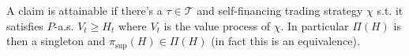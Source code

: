 A claim is attainable if there's a \( \tau \in \mathcal{T} \) and self-financing trading strategy \( \chi \) s.t. it satisfies \( P \)-a.s.
\( V_t \geq H_t \) where \( V_t \) is the value process of \( \chi \).
In particular \( \Pi(H) \) is then a singleton and \( \pi_{\text{sup}}(H) \in \Pi(H) \) (in fact this is an equivalence).


